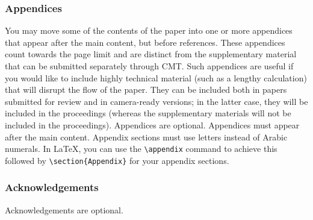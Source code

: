 \documentclass{article}
\begin{document}
\subsubsection{Appendices}
You may move some of the contents of the paper into one or more appendices that appear after the main content, but before references. These appendices count towards the page limit and are distinct from the supplementary material that can be submitted separately through CMT. Such appendices are useful if you would like to include highly technical material (such as a lengthy calculation) that will disrupt the flow of the paper. They can be included both in papers submitted for review and in camera-ready versions; in the latter case, they will be included in the proceedings (whereas the supplementary materials will not be included in the proceedings).
Appendices are optional. Appendices must appear after the main content.
Appendix sections must use letters instead of Arabic numerals. In \LaTeX, you can use the {\tt \textbackslash{}appendix} command to achieve this followed by  {\tt \textbackslash section\{Appendix\}} for your appendix sections.




\subsubsection{Acknowledgements}

Acknowledgements are optional.

\end{document}
